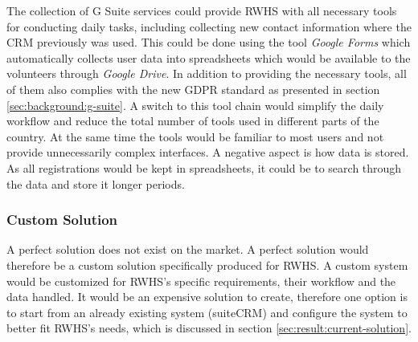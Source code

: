 The collection of G Suite services could provide RWHS with all necessary tools for conducting daily tasks, including collecting new contact information where the CRM previously was used. This could be done using the tool \textit{Google Forms} which automatically collects user data into spreadsheets which would be available to the volunteers through \textit{Google Drive}. In addition to providing the necessary tools, all of them also complies with the new GDPR standard as presented in section \ref{sec:background:g-suite}. A switch to this tool chain would simplify the daily workflow and reduce the total number of tools used in different parts of the country. At the same time the tools would be familiar to most users and not provide unnecessarily complex interfaces. A negative aspect is how data is stored. As all registrations would be kept in spreadsheets, it could be  to search through the data and store it longer periods.




\subsubsection{Custom Solution}
A perfect solution does not exist on the market. A perfect solution would therefore be a custom solution specifically produced for RWHS. A custom system would be customized for RWHS's specific requirements, their workflow and the data handled. It would be an expensive solution to create, therefore one option is to start from an already existing system (suiteCRM) and configure the system to better fit  RWHS's needs, which is discussed in section \ref{sec:result:current-solution}.


